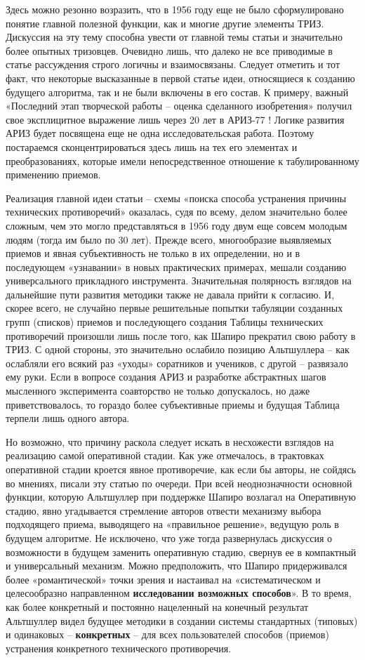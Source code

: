 \documentclass[11pt,a4paper]{article}
\begin{document}
Здесь можно резонно возразить, что в 1956 году еще не было сформулировано
понятие главной полезной функции, как и многие другие элементы ТРИЗ. Дискуссия
на эту тему способна увести от главной темы статьи и значительно более опытных
тризовцев. Очевидно лишь, что далеко не все приводимые в статье рассуждения
строго логичны и взаимосвязаны. Следует отметить и тот факт, что некоторые
высказанные в первой статье идеи, относящиеся к созданию будущего алгоритма,
так и не были включены в его состав. К примеру, важный «Последний этап
творческой работы -- оценка сделанного изобретения» получил свое эксплицитное
выражение лишь через 20 лет в АРИЗ-77 \cite{Altshuller1971}! Логике развития
АРИЗ будет посвящена еще не одна исследовательская работа. Поэтому постараемся
сконцентрироваться здесь лишь на тех его элементах и преобразованиях, которые
имели непосредственное отношение к табулированному применению приемов.

Реализация главной идеи статьи -- схемы «поиска способа устранения причины
технических противоречий» оказалась, судя по всему, делом значительно более
сложным, чем это могло представляться в 1956 году двум еще совсем молодым
людям (тогда им было по 30 лет). Прежде всего, многообразие выявляемых приемов
и явная субъективность не только в их определении, но и в последующем
«узнавании» в новых практических примерах, мешали созданию универсального
прикладного инструмента. Значительная полярность взглядов на дальнейшие пути
развития методики также не давала прийти к согласию. И, скорее всего, не
случайно первые решительные попытки табуляции созданных групп (списков)
приемов и последующего создания Таблицы технических противоречий произошли
лишь после того, как Шапиро прекратил свою работу в ТРИЗ. С одной стороны, это
значительно ослабило позицию Альтшуллера -- как ослабляли его всякий раз
«уходы» соратников и учеников, с другой -- развязало ему руки. Если в вопросе
создания АРИЗ и разработке абстрактных шагов мысленного эксперимента
соавторство не только допускалось, но даже приветствовалось, то гораздо более
субъективные приемы и будущая Таблица терпели лишь одного автора.

Но возможно, что причину раскола следует искать в несхожести взглядов на
реализацию самой оперативной стадии. Как уже отмечалось, в трактовках
оперативной стадии кроется явное противоречие, как если бы авторы, не сойдясь
во мнениях, писали эту статью по очереди. При всей неоднозначности основной
функции, которую Альтшуллер при поддержке Шапиро возлагал на Оперативную
стадию, явно угадывается стремление авторов отвести механизму выбора
подходящего приема, выводящего на «правильное решение», ведущую роль в будущем
алгоритме. Не исключено, что уже тогда развернулась дискуссия о возможности в
будущем заменить оперативную стадию, свернув ее в компактный и универсальный
механизм. Можно предположить, что Шапиро придерживался более «романтической»
точки зрения и настаивал на «систематическом и целесообразно направленном
\textbf{исследовании возможных способов}». В то время, как более конкретный и
постоянно нацеленный на конечный результат Альтшуллер видел будущее методики в
создании системы стандартных (типовых) и одинаковых -- \textbf{конкретных} --
для всех пользователей способов (приемов) устранения конкретного технического
противоречия.
\end{document}
